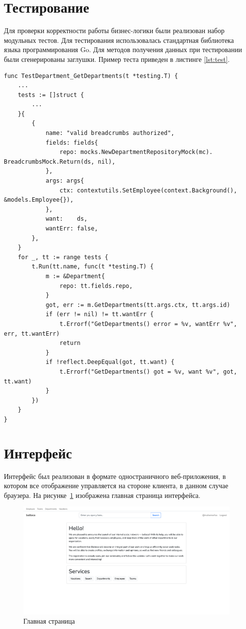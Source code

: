 \section{Тестирование}
Для проверки корректности работы бизнес-логики были реализован набор модульных тестов. Для тестирования использовалась стандартная библиотека языка программирования Go. Для методов получения данных при тестировании были сгенерированы заглушки. Пример теста приведен в листинге \ref{lst:test}.


\begin{lstlisting}[label=lst:test,caption=Пример модульного теста]
func TestDepartment_GetDepartments(t *testing.T) {
	...
	tests := []struct {
		...
	}{
		{
			name: "valid breadcrumbs authorized",
			fields: fields{
				repo: mocks.NewDepartmentRepositoryMock(mc). BreadcrumbsMock.Return(ds, nil),
			},
			args: args{
				ctx: contextutils.SetEmployee(context.Background(), &models.Employee{}),
			},
			want:    ds,
			wantErr: false,
		},
	}
	for _, tt := range tests {
		t.Run(tt.name, func(t *testing.T) {
			m := &Department{
				repo: tt.fields.repo,
			}
			got, err := m.GetDepartments(tt.args.ctx, tt.args.id)
			if (err != nil) != tt.wantErr {
				t.Errorf("GetDepartments() error = %v, wantErr %v", err, tt.wantErr)
				return
			}
			if !reflect.DeepEqual(got, tt.want) {
				t.Errorf("GetDepartments() got = %v, want %v", got, tt.want)
			}
		})
	}
}
\end{lstlisting}

\section{Интерфейс}
Интерфейс был реализован в формате одностраничного веб-приложения, в котором все отображение управляется на стороне клиента, в данном случае браузера. На рисунке~\ref{img:ss1} изображена главная страница интерфейса.

\begin{figure}[h!]
\centering
    \includegraphics[width=0.9\linewidth]{assets/ss1.png}
    \caption{Главная страница}
    \label{img:ss1}	
\end{figure}

